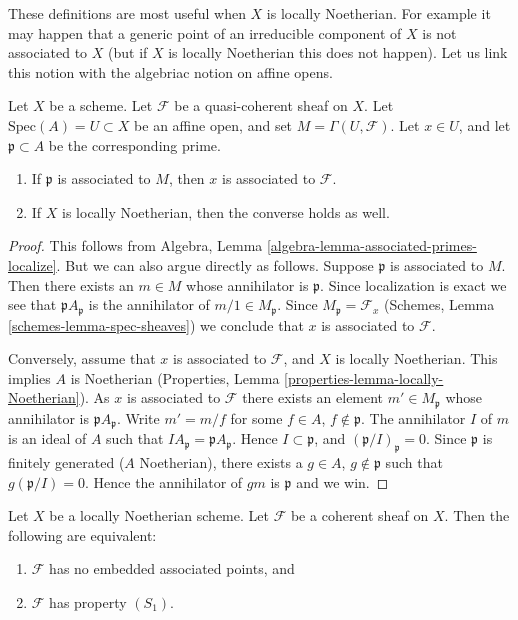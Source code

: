 \noindent
These definitions are most useful when $X$ is locally Noetherian.
For example it may happen that a generic point of an irreducible
component of $X$ is not associated to $X$ (but if $X$ is locally
Noetherian this does not happen).
Let us link this notion with the algebriac notion on affine opens.

\begin{lemma}
\label{lemma-associated-affine-open}
Let $X$ be a scheme. Let $\mathcal{F}$ be a quasi-coherent sheaf on $X$.
Let $\text{Spec}(A) = U \subset X$ be an affine open, and set
$M = \Gamma(U, \mathcal{F})$.
Let $x \in U$, and let $\mathfrak p \subset A$ be the corresponding prime.
\begin{enumerate}
\item If $\mathfrak p$ is associated to $M$, then $x$ is associated
to $\mathcal{F}$.
\item If $X$ is locally Noetherian, then the converse holds as well.
\end{enumerate}
\end{lemma}

\begin{proof}
This follows from
Algebra, Lemma \ref{algebra-lemma-associated-primes-localize}.
But we can also argue directly as follows.
Suppose $\mathfrak p$ is associated to $M$.
Then there exists an $m \in M$ whose annihilator is $\mathfrak p$.
Since localization is exact we see that
$\mathfrak pA_{\mathfrak p}$ is the annihilator of
$m/1 \in M_{\mathfrak p}$. Since $M_{\mathfrak p} = \mathcal{F}_x$
(Schemes, Lemma \ref{schemes-lemma-spec-sheaves})
we conclude that $x$ is associated to $\mathcal{F}$.

\medskip\noindent
Conversely, assume that $x$ is associated to $\mathcal{F}$,
and $X$ is locally Noetherian.
This implies $A$ is Noetherian
(Properties, Lemma \ref{properties-lemma-locally-Noetherian}).
As $x$ is associated to $\mathcal{F}$
there exists an element $m' \in M_{\mathfrak p}$ whose
annihilator is $\mathfrak pA_{\mathfrak p}$. Write
$m' = m/f$ for some $f \in A$, $f \not \in \mathfrak p$.
The annihilator $I$ of $m$ is an ideal of $A$ such that
$IA_{\mathfrak p} = \mathfrak pA_{\mathfrak p}$. Hence
$I \subset \mathfrak p$, and $(\mathfrak p/I)_{\mathfrak p} = 0$.
Since $\mathfrak p$ is finitely generated ($A$ Noetherian),
there exists a $g \in A$, $g \not \in \mathfrak p$ such that 
$g(\mathfrak p/I) = 0$. Hence the annihilator of $gm$ is
$\mathfrak p$ and we win.
\end{proof}

\begin{lemma}
\label{lemma-S1-no-embedded}
Let $X$ be a locally Noetherian scheme.
Let $\mathcal{F}$ be a coherent sheaf on $X$.
Then the following are equivalent:
\begin{enumerate}
\item $\mathcal{F}$ has no embedded associated points, and
\item $\mathcal{F}$ has property $(S_1)$.
\end{enumerate}
\end{lemma}

